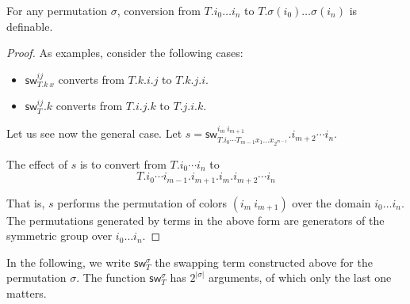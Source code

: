 \documentclass[10pt,a4paper]{article}
\newcommand\sw[2]{\mathsf{sw}^{#1}_{#2}}
\begin{document}
\begin{theorem}
For any permutation $σ$, conversion from $T.i_0 … i_n$ to $T.σ(i_0) …
σ(i_n)$ is definable.

\end{theorem}

\begin{proof}
As examples, consider the following cases:
\begin{itemize}
\item $\sw{ij} {T.k~x}$ converts from $T.k.i.j$ to $T.k.j.i$.
\item $\sw{ij} {T}.k$ converts from $T.i.j.k$ to $T.j.i.k$.
\end{itemize}

Let us see now the general case.
Let $s = \sw{i_m~i_{m+1}} {T.i_0⋯T_{m-1} x_1 … x_{2^{m-1}}}.i_{m+2}⋯i_n$.

The effect of $s$ is to convert from $T.i_0 ⋯ i_n$ to
$$T.i_0⋯i_{m-1}.i_{m+1}.i_m .i_{m+2}⋯i_n$$

That is, $s$ performs the permutation of colors $(i_m~i_{m+1})$ over
the domain $i_0 … i_n$. The permutations generated by terms in the
above form are generators of the symmetric group over $i_0 … i_n$.
\end{proof}

In the following, we write $\sw {σ} T$ the swapping term constructed
above for the permutation $σ$. The function $\sw {σ} T$ has $2^{|σ|}$
arguments, of which only the last one matters.
\end{document}
